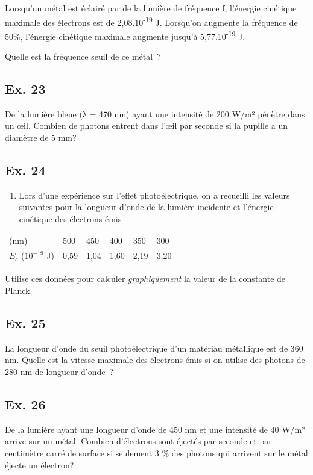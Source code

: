 {Lorsqu'un métal est éclairé par de la lumière de fréquence f, l'énergie
cinétique maximale des électrons est de 2,08.10\textsuperscript{-19} J.
Lorsqu'on augmente la fréquence de 50\%, l'énergie cinétique maximale
augmente jusqu'à 5,77.10\textsuperscript{-19} J.

Quelle est la fréquence seuil de ce métal~?

\subsection{Ex. 23}

De la lumière bleue (λ = 470 nm) ayant une intensité de 200 W/m² pénètre
dans un œil. Combien de photons entrent dans l'œil par seconde si la
pupille a un diamètre de 5 mm?

\subsection{Ex. 24}

\begin{enumerate}
\item  Lors d'une expérience sur l'effet photoélectrique, on a recueilli les
  valeurs suivantes pour la longueur d'onde de la lumière incidente et
  l'énergie cinétique des électrons émis
\end{enumerate}

\begin{longtable}[]{@{}llllll@{}}
(nm) & 500 & 450 & 400 & 350 & 300\tabularnewline
$E_c$ ($10^{-19}$ J) & 0,59 & 1,04 & 1,60 & 2,19 &
3,20\tabularnewline
\end{longtable}

Utilise ces données pour calculer \emph{graphiquement} la
valeur de la constante de Planck.

\subsection{Ex. 25}

La longueur d'onde du seuil photoélectrique d'un matériau métallique est
de 360 nm. Quelle est la vitesse maximale des électrons émis si on
utilise des photons de 280 nm de longueur d'onde~?

\subsection{Ex. 26}

De la lumière ayant une longueur d'onde de 450 nm et une intensité de 40
W/m² arrive sur un métal. Combien d'électrons sont éjectés par seconde
et par centimètre carré de surface si seulement 3 \% des photons qui
arrivent sur le métal éjecte un électron?

}
